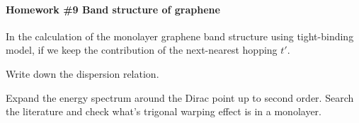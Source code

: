 
\paragraph{Homework \#9 Band structure of graphene}

\begin{problem}
  In the calculation of the monolayer graphene band structure using
  tight-binding model, if we keep the contribution of the next-nearest
  hopping $t'$.
  \begin{enumext}
    \item Write down the dispersion relation.
    \item Expand the energy spectrum around the Dirac point up to second order.
    Search the literature and check what's trigonal warping effect is in
    a monolayer.
  \end{enumext}
\end{problem}
